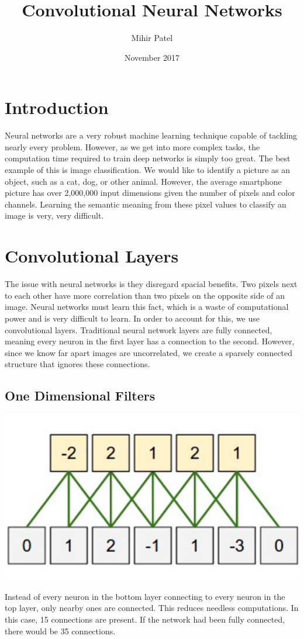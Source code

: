 \documentclass{exam}
\title{Convolutional Neural Networks}
\author{Mihir Patel}
\date{November 2017}
\begin{document}
\maketitle

\section{Introduction}
Neural networks are a very robust machine learning technique capable of tackling nearly every problem. However, as we get into more complex tasks, the computation time required to train deep networks is simply too great. The best example of this is image classification. We would like to identify a picture as an object, such as a cat, dog, or other animal. However, the average smartphone picture has over 2,000,000 input dimensions given the number of pixels and color channels. Learning the semantic meaning from these pixel values to classify an image is very, very difficult.

\section{Convolutional Layers}
The issue with neural networks is they disregard spacial benefits. Two pixels next to each other have more correlation than two pixels on the opposite side of an image. Neural networks must learn this fact, which is a waste of computational power and is very difficult to learn. In order to account for this, we use convolutional layers. Traditional neural network layers are fully connected, meaning every neuron in the first layer has a connection to the second. However, since we know far apart images are uncorrelated, we create a sparsely connected structure that ignores these connections.

\subsection{One Dimensional Filters}
\begin{center}
\includegraphics[scale=0.5]{OneDimConv.png}
\end{center}
Instead of every neuron in the bottom layer connecting to every neuron in the top layer, only nearby ones are connected. This reduces needless computations. In this case, 15 connections are present. If the network had been fully connected, there would be 35 connections.
\end{document}
